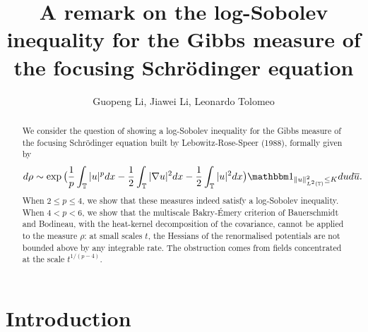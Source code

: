 \documentclass[letterpaper, 11pt,  reqno]{amsart}
\title[Log Sobolev inequality for focusing NLS]{A remark on the log-Sobolev inequality for the Gibbs measure of the focusing Schr\"odinger equation}
\author{Guopeng Li, Jiawei Li, Leonardo Tolomeo}
\theoremstyle{definition}
\newcommand{\1}{\mathbbm 1}
\newcommand{\0}{\mathbf 0}
\numberwithin{equation}{section}
\numberwithin{theorem}{section}
\begin{document}
 
 
 
 
\begin{abstract}
 
   We consider the question of showing a log-Sobolev inequality for the Gibbs measure of the focusing Schr\"odinger equation built by Lebowitz-Rose-Speer (1988), formally given by 
    $$ d\rho \sim \exp\big(\frac 1 p\int_{\mathbb T} |u|^p d x - \frac 12\int_{\mathbb T} |\nabla u|^2 d x - \frac 12\int_{\mathbb T} |u|^2 d x\big) \mathbbm 1_{\| u \|_{L^2(\mathbb T)}^2 \le K}dud\overline{u}. $$
    When $2 \le p \le 4$, we show that these measures indeed satisfy a log-Sobolev inequality. When $4< p<6$, we show that the multiscale Bakry-\'Emery criterion of Bauerschmidt and Bodineau, with the heat-kernel decomposition of the covariance, cannot be applied to the measure $\rho$: at small scales $t$, the Hessians of the renormalised potentials are not bounded above by any integrable rate. The obstruction comes from fields concentrated at the scale $t^{1/(p-4)}$.
 
\end{abstract}
 
\maketitle
 
\section{Introduction}
 
 
 
 
 
\end{document}
